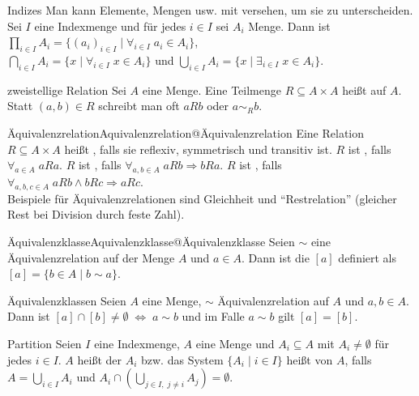\begin{Def}{Indizes}
    Man kann Elemente, Mengen usw. mit  versehen, um sie zu
    unterscheiden.
    Sei $I$ eine Indexmenge und für jedes $i \in I$ sei $A_i$ Menge.
    Dann ist $\prod_{i \in I} A_i = \{(a_i)_{i \in I} \;|\;
    \forall_{i \in I}\; a_i \in A_i\}$, \\
    $\bigcap_{i \in I} A_i = \{x \;|\; \forall_{i \in I}\; x \in A_i\}$ und
    $\bigcup_{i \in I} A_i = \{x \;|\; \exists_{i \in I}\; x \in A_i\}$.
\end{Def}

\begin{Def}{zweistellige Relation}
    Sei $A$ eine Menge.
    Eine Teilmenge $R \subseteq A \times A$ heißt
     auf $A$.
    Statt $(a,b) \in R$ schreibt man oft $aRb$ oder $a \sim_R b$.
\end{Def}

\begin{xDef}{Äquivalenzrelation}{Aquivalenzrelation@Äquivalenzrelation}
    Eine Relation $R \subseteq A \times A$ heißt
    ,
    falls sie reflexiv, symmetrisch und transitiv ist.
    $R$ ist , falls $\forall_{a \in A}\; aRa$.
    $R$ ist , falls
    $\forall_{a, b \in A}\; aRb \Rightarrow bRa$.
    $R$ ist , falls
    $\forall_{a, b, c \in A}\; aRb \land bRc \Rightarrow aRc$. \\
    Beispiele für Äquivalenzrelationen sind Gleichheit und
    "`Restrelation"' (gleicher Rest bei Division durch feste Zahl).
\end{xDef}

\begin{xDef}{Äquivalenzklasse}{Aquivalenzklasse@Äquivalenzklasse}
    Seien $\sim$ eine Äquivalenzrelation auf der Menge $A$ und $a \in A$.
    Dann ist die 
    $[a]$ definiert als $[a] = \{b \in A \;|\; b \sim a\}$.
\end{xDef}

\begin{Lemma}{Äquivalenzklassen}
    Seien $A$ eine Menge, $\sim$ Äquivalenzrelation auf $A$ und $a, b \in A$.
    Dann ist $[a] \cap [b] \not= \emptyset \;\Leftrightarrow\; a \sim b$
    und im Falle $a \sim b$ gilt $[a] = [b]$.
\end{Lemma}

\begin{Def}{Partition}
    Seien $I$ eine Indexmenge, $A$ eine Menge und $A_i \subseteq A$ mit
    $A_i \not= \emptyset$ für jedes $i \in I$.
    $A$ heißt  der $A_i$ bzw. das System
    $\{A_i \;|\; i \in I\}$ heißt  von $A$, falls
    $A = \bigcup_{i \in I} A_i$ und
    $A_i \cap \left(\bigcup_{j \in I,\; j \not= i} A_j\right) = \emptyset$.
\end{Def}

